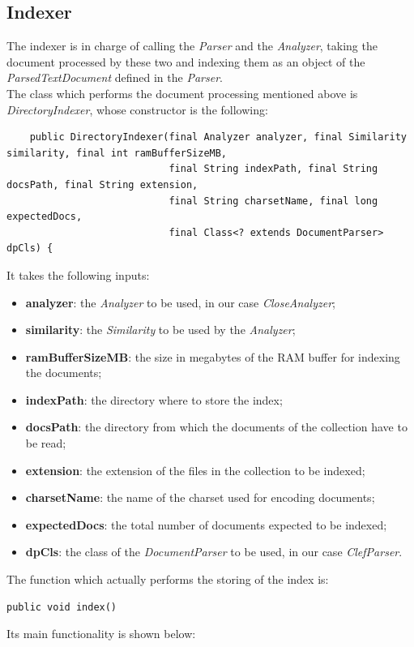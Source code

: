\subsection{Indexer}
The indexer is in charge of calling the \textit{Parser} and the \textit{Analyzer}, taking the document processed by these two and indexing them as an object of the \textit{ParsedTextDocument} defined in the \textit{Parser}. \\
The class which performs the document processing mentioned above is \textit{DirectoryIndexer}, whose constructor is the following:
\begin{lstlisting}
    public DirectoryIndexer(final Analyzer analyzer, final Similarity similarity, final int ramBufferSizeMB,
                            final String indexPath, final String docsPath, final String extension,
                            final String charsetName, final long expectedDocs,
                            final Class<? extends DocumentParser> dpCls) {
\end{lstlisting}
It takes the following inputs:
\begin{itemize}
\item \textbf{analyzer}: the \textit{Analyzer} to be used, in our case \textit{CloseAnalyzer};
\item \textbf{similarity}: the \textit{Similarity} to be used by the \textit{Analyzer};
\item \textbf{ramBufferSizeMB}: the size in megabytes of the RAM buffer for indexing the documents;
\item \textbf{indexPath}: the directory where to store the index;
\item \textbf{docsPath}: the directory from which the documents of the collection have to be read;
\item \textbf{extension}: the extension of the files in the collection to be indexed;
\item \textbf{charsetName}: the name of the charset used for encoding documents;
\item \textbf{expectedDocs}: the total number of documents expected to be indexed;
\item \textbf{dpCls}: the class of the \textit{DocumentParser} to be used, in our case \textit{ClefParser}.
\end{itemize}
The function which actually performs the storing of the index is:
\begin{verbatim}
public void index()
\end{verbatim}
Its main functionality is shown below:
